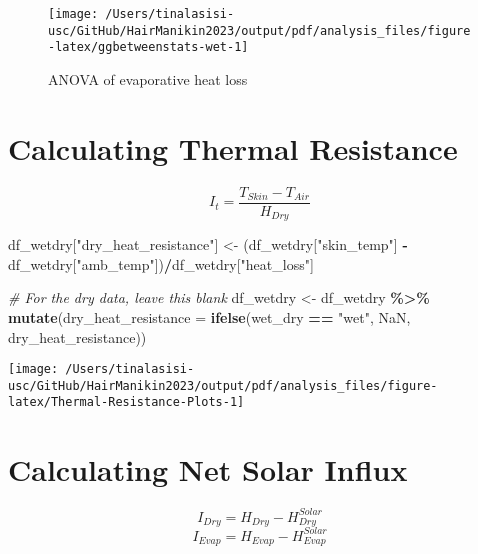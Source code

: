 \documentclass[
]{article}
\newenvironment{Shaded}{\begin{snugshade}}{\end{snugshade}}
\newcommand{\AttributeTok}[1]{\textcolor[rgb]{0.13,0.29,0.53}{#1}}
\newcommand{\CommentTok}[1]{\textcolor[rgb]{0.56,0.35,0.01}{\textit{#1}}}
\newcommand{\ConstantTok}[1]{\textcolor[rgb]{0.56,0.35,0.01}{#1}}
\newcommand{\FunctionTok}[1]{\textcolor[rgb]{0.13,0.29,0.53}{\textbf{#1}}}
\newcommand{\NormalTok}[1]{#1}
\newcommand{\OtherTok}[1]{\textcolor[rgb]{0.56,0.35,0.01}{#1}}
\newcommand{\SpecialCharTok}[1]{\textcolor[rgb]{0.81,0.36,0.00}{\textbf{#1}}}
\newcommand{\StringTok}[1]{\textcolor[rgb]{0.31,0.60,0.02}{#1}}
\begin{document}
\begin{figure}

{\centering \texttt{[image: /Users/tinalasisi-usc/GitHub/HairManikin2023/output/pdf/analysis\_files/figure-latex/ggbetweenstats-wet-1]} 

}

\caption{ANOVA of evaporative heat loss}\label{fig:ggbetweenstats-wet}
\end{figure}

\hypertarget{calculating-thermal-resistance}{%
\section{Calculating Thermal
Resistance}\label{calculating-thermal-resistance}}

\[I_t = \frac{T_{Skin} - T_{Air}}{H_{Dry}}\]

\begin{Shaded}
\begin{Highlighting}[]
\NormalTok{df\_wetdry[}\StringTok{"dry\_heat\_resistance"}\NormalTok{] }\OtherTok{\textless{}{-}}\NormalTok{ (df\_wetdry[}\StringTok{"skin\_temp"}\NormalTok{] }\SpecialCharTok{{-}}
\NormalTok{    df\_wetdry[}\StringTok{"amb\_temp"}\NormalTok{])}\SpecialCharTok{/}\NormalTok{df\_wetdry[}\StringTok{"heat\_loss"}\NormalTok{]}

\CommentTok{\# For the dry data, leave this blank}
\NormalTok{df\_wetdry }\OtherTok{\textless{}{-}}\NormalTok{ df\_wetdry }\SpecialCharTok{\%\textgreater{}\%}
    \FunctionTok{mutate}\NormalTok{(}\AttributeTok{dry\_heat\_resistance =} \FunctionTok{ifelse}\NormalTok{(wet\_dry }\SpecialCharTok{==} \StringTok{"wet"}\NormalTok{,}
        \ConstantTok{NaN}\NormalTok{, dry\_heat\_resistance))}
\end{Highlighting}
\end{Shaded}

\texttt{[image: /Users/tinalasisi-usc/GitHub/HairManikin2023/output/pdf/analysis\_files/figure-latex/Thermal-Resistance-Plots-1]}

\hypertarget{calculating-net-solar-influx}{%
\section{Calculating Net Solar
Influx}\label{calculating-net-solar-influx}}

\[I_{Dry} = H_{Dry} - H_{Dry}^{Solar}\]
\[I_{Evap} = H_{Evap} - H_{Evap}^{Solar}\]
\end{document}
